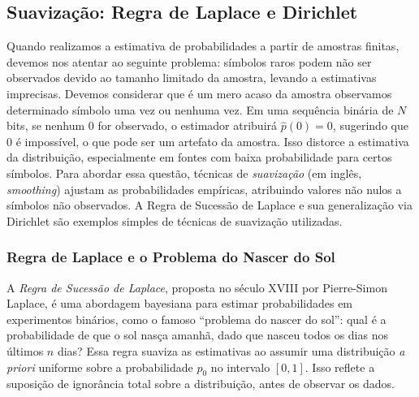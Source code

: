\subsection{Suavização: Regra de Laplace e Dirichlet}
\label{subsec:suavizacao}

Quando realizamos a estimativa de probabilidades a partir de amostras finitas,
devemos nos atentar ao seguinte problema: símbolos raros podem não ser observados
devido ao tamanho limitado da amostra, levando a estimativas
imprecisas. Devemos considerar que é um mero acaso da amostra observamos
determinado símbolo uma vez ou nenhuma vez.
Em uma sequência binária de  $N$ bits, se nenhum 0
for observado, o estimador atribuirá $\hat{p}(0) = 0$, sugerindo
que 0 é impossível, o que pode ser um artefato da amostra. Isso distorce a
estimativa da distribuição, especialmente em fontes com baixa probabilidade para certos
símbolos. Para abordar essa questão, técnicas de \emph{suavização}
(em inglês, \textit{smoothing}) ajustam as probabilidades empíricas, atribuindo valores
não nulos a símbolos não observados. A Regra de Sucessão de
Laplace e sua generalização via Dirichlet são exemplos simples de
técnicas de suavização utilizadas.



\subsubsection{Regra de Laplace e o Problema do Nascer do Sol}
A \emph{Regra de Sucessão de Laplace}, proposta no século XVIII por Pierre-Simon
Laplace, é uma abordagem bayesiana para estimar probabilidades em experimentos
binários, como o famoso ``problema do nascer do sol'': qual é a probabilidade de
que o sol nasça amanhã, dado que nasceu todos os dias nos últimos $n$ dias?
Essa regra suaviza as estimativas ao assumir uma distribuição \textit{a priori} uniforme
sobre a probabilidade $p_0$ no intervalo $[0, 1]$.
Isso reflete a suposição de ignorância total sobre a distribuição,
antes de observar os dados.


